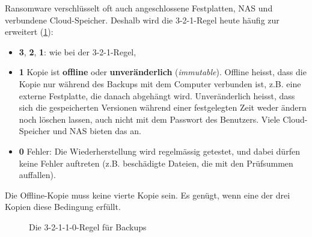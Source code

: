 Ransomware verschlüsselt oft auch angeschlossene Festplatten, \acrshort{NAS} und verbundene Cloud-Speicher. Deshalb wird die 3-2-1-Regel heute häufig zur  erweitert (\cref{fig:backup32110}):
\begin{itemize}
    \item \textbf{3}, \textbf{2}, \textbf{1}: wie bei der 3-2-1-Regel,
    \item \textbf{1} Kopie ist \textbf{offline} oder \textbf{unveränderlich} (\textit{immutable}). Offline heisst, dass die Kopie nur während des Backups mit dem Computer verbunden ist, z.B. eine externe Festplatte, die danach abgehängt wird. Unveränderlich heisst, dass sich die gespeicherten Versionen während einer festgelegten Zeit weder ändern noch löschen lassen, auch nicht mit dem Passwort des Benutzers. Viele Cloud-Speicher und \acrshort{NAS} bieten das an.
    \item \textbf{0} Fehler: Die Wiederherstellung wird regelmässig getestet, und dabei dürfen keine Fehler auftreten (z.B. beschädigte Dateien, die mit den Prüfsummen auffallen).
\end{itemize}
Die Offline-Kopie muss keine vierte Kopie sein. Es genügt, wenn eine der drei Kopien diese Bedingung erfüllt.

\begin{figure}[H]
    \centering
    
    \caption{Die 3-2-1-1-0-Regel für Backups}
    \label{fig:backup32110}
\end{figure}
